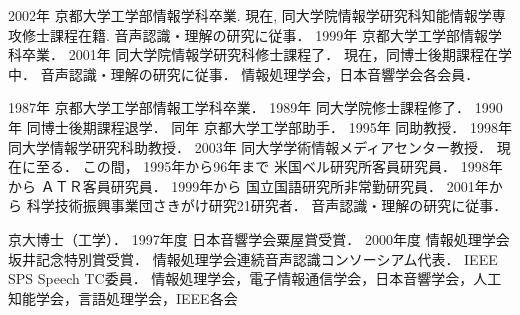 \begin{biography}
{
2002年 京都大学工学部情報学科卒業.
現在, 同大学院情報学研究科知能情報学専攻修士課程在籍.
音声認識・理解の研究に従事．
}
{
1999年 京都大学工学部情報学科卒業．
2001年 同大学院情報学研究科修士課程了．
現在，同博士後期課程在学中．
音声認識・理解の研究に従事．
情報処理学会，日本音響学会各会員．
}
{
1987年 京都大学工学部情報工学科卒業．
1989年 同大学院修士課程修了．
1990年 同博士後期課程退学．
同年   京都大学工学部助手．
1995年 同助教授．
1998年 同大学情報学研究科助教授．
2003年 同大学学術情報メディアセンター教授．
現在に至る．
この間，
1995年から96年まで 米国ベル研究所客員研究員．
1998年から ＡＴＲ客員研究員．
1999年から 国立国語研究所非常勤研究員．
2001年から 科学技術振興事業団さきがけ研究21研究者．
音声認識・理解の研究に従事．

京大博士（工学）．
1997年度 日本音響学会粟屋賞受賞．
2000年度 情報処理学会坂井記念特別賞受賞．
情報処理学会連続音声認識コンソーシアム代表．
IEEE SPS Speech TC委員．
情報処理学会，電子情報通信学会，日本音響学会，人工知能学会，言語処理学会，IEEE各会
}


\end{biography}


